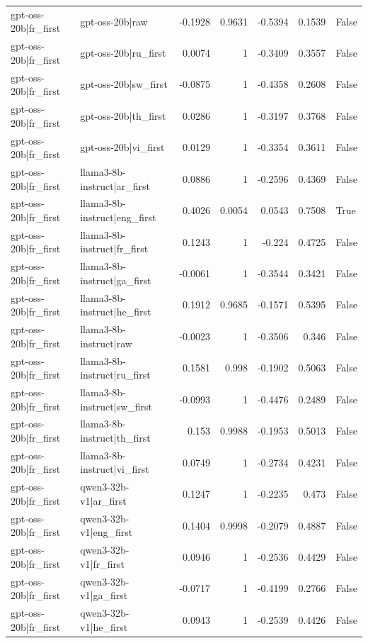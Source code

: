 \begin{table}
\begin{tabular}{l l r r r r l}
gpt-oss-20b|fr_first & gpt-oss-20b|raw & -0.1928 & 0.9631 & -0.5394 & 0.1539 & False \\
gpt-oss-20b|fr_first & gpt-oss-20b|ru_first & 0.0074 & 1 & -0.3409 & 0.3557 & False \\
gpt-oss-20b|fr_first & gpt-oss-20b|sw_first & -0.0875 & 1 & -0.4358 & 0.2608 & False \\
gpt-oss-20b|fr_first & gpt-oss-20b|th_first & 0.0286 & 1 & -0.3197 & 0.3768 & False \\
gpt-oss-20b|fr_first & gpt-oss-20b|vi_first & 0.0129 & 1 & -0.3354 & 0.3611 & False \\
gpt-oss-20b|fr_first & llama3-8b-instruct|ar_first & 0.0886 & 1 & -0.2596 & 0.4369 & False \\
gpt-oss-20b|fr_first & llama3-8b-instruct|eng_first & 0.4026 & 0.0054 & 0.0543 & 0.7508 & True \\
gpt-oss-20b|fr_first & llama3-8b-instruct|fr_first & 0.1243 & 1 & -0.224 & 0.4725 & False \\
gpt-oss-20b|fr_first & llama3-8b-instruct|ga_first & -0.0061 & 1 & -0.3544 & 0.3421 & False \\
gpt-oss-20b|fr_first & llama3-8b-instruct|he_first & 0.1912 & 0.9685 & -0.1571 & 0.5395 & False \\
gpt-oss-20b|fr_first & llama3-8b-instruct|raw & -0.0023 & 1 & -0.3506 & 0.346 & False \\
gpt-oss-20b|fr_first & llama3-8b-instruct|ru_first & 0.1581 & 0.998 & -0.1902 & 0.5063 & False \\
gpt-oss-20b|fr_first & llama3-8b-instruct|sw_first & -0.0993 & 1 & -0.4476 & 0.2489 & False \\
gpt-oss-20b|fr_first & llama3-8b-instruct|th_first & 0.153 & 0.9988 & -0.1953 & 0.5013 & False \\
gpt-oss-20b|fr_first & llama3-8b-instruct|vi_first & 0.0749 & 1 & -0.2734 & 0.4231 & False \\
gpt-oss-20b|fr_first & qwen3-32b-v1|ar_first & 0.1247 & 1 & -0.2235 & 0.473 & False \\
gpt-oss-20b|fr_first & qwen3-32b-v1|eng_first & 0.1404 & 0.9998 & -0.2079 & 0.4887 & False \\
gpt-oss-20b|fr_first & qwen3-32b-v1|fr_first & 0.0946 & 1 & -0.2536 & 0.4429 & False \\
gpt-oss-20b|fr_first & qwen3-32b-v1|ga_first & -0.0717 & 1 & -0.4199 & 0.2766 & False \\
gpt-oss-20b|fr_first & qwen3-32b-v1|he_first & 0.0943 & 1 & -0.2539 & 0.4426 & False \\

\end{tabular}
\end{table}
